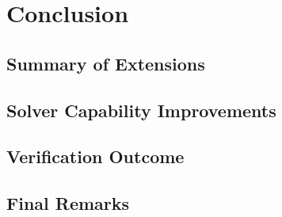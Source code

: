 \chapter{Conclusion}

\section{Summary of Extensions}

\section{Solver Capability Improvements}

\section{Verification Outcome}

\section{Final Remarks}
